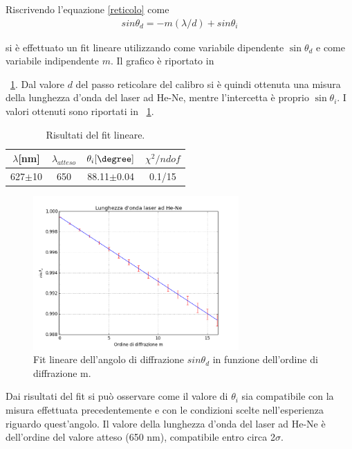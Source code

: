 \documentclass[a4paper,10pt]{article}
\begin{document}
{{{Riscrivendo l'equazione \ref{reticolo} come
\begin{align*}
sin\theta_d = - m(\lambda/d) + sin\theta_i
\end{align*} 
  
si è effettuato un fit lineare utilizzando come variabile dipendente $\sin\theta_d$ e come variabile indipendente $m$. Il grafico è riportato in \figurename{~\ref{fig:fita}.
Dal valore $d$ del passo reticolare del calibro si è quindi ottenuta una misura della lunghezza d'onda del laser ad He-Ne, mentre l'intercetta è proprio $\sin\theta_i$. I valori ottenuti sono riportati in \tablename{~\ref{tab:fita}}.


\begin{table}[H]
	\centering
	\begin{tabular}{c|c|c|c}
$\lambda$[nm] &$\lambda_{atteso}$ &$\theta_i[\degree]$& $\chi^2/ndof$ \\
\hline
627$\pm$10 & 650 & 88.11$\pm$0.04 & 0.1/15\\
\hline
	\end{tabular}
\caption{Risultati del fit lineare.}
\label{tab:fita}
\end{table}


\begin{figure}[H]
	\centering
	\includegraphics[width=0.7\textwidth]{../grafici/fita.png}
	\caption{Fit lineare dell'angolo di diffrazione $sin\theta_d$ in funzione dell'ordine di diffrazione m.}
	\label{fig:fita}
\end{figure}


Dai risultati del fit si può osservare come il valore di $\theta_i$ sia compatibile con la misura effettuata precedentemente e con le condizioni scelte nell'esperienza riguardo quest'angolo.
Il valore della lunghezza d'onda del laser ad He-Ne è dell'ordine del valore atteso (650 nm), compatibile entro circa 2$\sigma$.

}}}}
\end{document}
